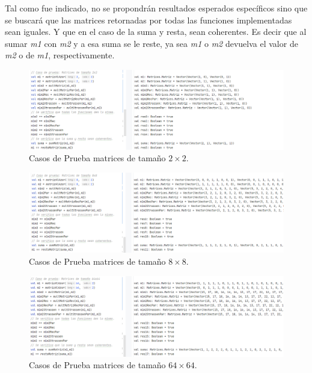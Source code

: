 \documentclass{article}
\begin{document}
Tal como fue indicado, no se propondrán resultados esperados específicos sino que se buscará que las matrices retornadas por todas las funciones implementadas sean iguales. Y que en el caso de la suma y resta, sean coherentes. Es decir que al sumar \textit{m1} con \textit{m2} y a esa suma se le reste, ya sea \textit{m1} o \textit{m2} devuelva el valor de \textit{m2} o de \textit{m1}, respectivamente.\\

\begin{figure}[h]
    \begin{minipage}{1\textwidth}
        \centering
        \includegraphics[scale=0.52]{Pruebas1.png}
        \caption{Casos de Prueba matrices de tamaño \(2 \times 2\).}
        \label{1}
    \end{minipage}
\end{figure}

\begin{figure}[h]
    \begin{minipage}{1\textwidth}
        \centering
        \includegraphics[scale=0.52]{Pruebas2.png}
        \caption{Casos de Prueba matrices de tamaño \(8 \times 8\).}
        \label{1}
    \end{minipage}
\end{figure}

\begin{figure}[h]
    \begin{minipage}{1\textwidth}
        \centering
        \includegraphics[scale=0.52]{Pruebas3.png}
        \caption{Casos de Prueba matrices de tamaño \(64 \times 64\).}
        \label{1}
    \end{minipage}
\end{figure}
\end{document}

